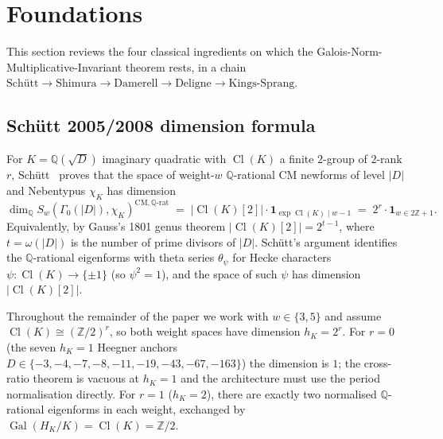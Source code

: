 \documentclass[11pt]{amsart}
\theoremstyle{definition}
\theoremstyle{remark}
\DeclareMathOperator{\Cl}{Cl}
\DeclareMathOperator{\Gal}{Gal}
\newcommand{\Q}{\mathbb{Q}}
\newcommand{\Z}{\mathbb{Z}}
\newcommand{\HK}{H_K}
\newcommand{\chiK}{\chi_K}
\begin{document}
\section{Foundations}\label{sec:foundations}

This section reviews the four classical ingredients on which the
Galois-Norm-Multiplicative-Invariant theorem rests, in a chain
$\text{Sch\"utt} \longrightarrow \text{Shimura} \longrightarrow
\text{Damerell} \longrightarrow \text{Deligne} \longrightarrow
\text{Kings-Sprang}$.

\subsection{Sch\"utt 2005/2008 dimension formula}\label{ss:schutt}
For $K = \Q(\sqrt{D})$ imaginary quadratic with $\Cl(K)$ a finite
$2$-group of $2$-rank $r$, Sch\"utt~\cite{Schutt2008} proves that the
space of weight-$w$ $\Q$-rational CM newforms of level $|D|$ and
Nebentypus $\chiK$ has dimension
\begin{equation}\label{eq:schutt-dim}
\dim_\Q S_w(\Gamma_0(|D|), \chiK)^{\mathrm{CM},\Q\text{-rat}}
\; = \; |\Cl(K)[2]| \cdot \mathbf{1}_{\exp\Cl(K) \mid w-1}
\; = \; 2^r \cdot \mathbf{1}_{w \in 2\Z + 1}.
\end{equation}
Equivalently, by Gauss's 1801 genus theorem
$|\Cl(K)[2]| = 2^{t-1}$, where $t = \omega(|D|)$ is the number of
prime divisors of $|D|$. Sch\"utt's argument identifies the
$\Q$-rational eigenforms with theta series $\theta_\psi$ for
Hecke characters $\psi : \Cl(K) \to \{\pm 1\}$ (so $\psi^2 = 1$), and
the space of such $\psi$ has dimension $|\Cl(K)[2]|$.

Throughout the remainder of the paper we work with $w \in \{3, 5\}$
and assume $\Cl(K) \cong (\Z/2)^r$, so both weight spaces have
dimension $h_K = 2^r$. For $r = 0$ (the seven $h_K = 1$ Heegner
anchors $D \in \{-3, -4, -7, -8, -11, -19, -43, -67, -163\}$) the
dimension is $1$; the cross-ratio theorem is vacuous at $h_K = 1$ and
the architecture must use the period normalisation directly. For
$r = 1$ ($h_K = 2$), there are exactly two normalised $\Q$-rational
eigenforms in each weight, exchanged by $\Gal(\HK/K) = \Cl(K) = \Z/2$.
\end{document}
